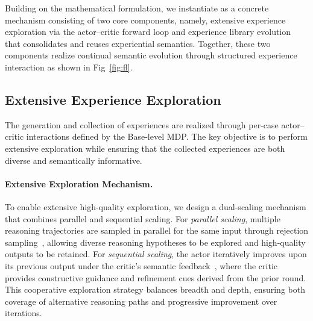 Building on the mathematical formulation, we instantiate \method{} as a concrete mechanism consisting of two core components, namely, extensive experience exploration via the actor–critic forward loop and experience library evolution that consolidates and reuses experiential semantics.
Together, these two components realize continual semantic evolution through structured experience interaction as shown in Fig~\ref{fig:fl}.

\subsection{Extensive Experience Exploration}
The generation and collection of experiences are realized through per-case actor–critic interactions defined by the Base-level MDP. The key objective is to perform extensive exploration while ensuring that the collected experiences are both diverse and semantically informative.

\paragraph{Extensive Exploration Mechanism.}
To enable extensive high-quality exploration, we design a dual-scaling mechanism that combines parallel and sequential scaling. 
For \emph{parallel scaling}, multiple reasoning trajectories are sampled in parallel for the same input through rejection sampling~\cite{fujimoto2021minimalist,dong2023raft,gulcehre2023reinforced}, allowing diverse reasoning hypotheses to be explored and high-quality outputs to be retained.
For \emph{sequential scaling}, the actor iteratively improves upon its previous output under the critic’s semantic feedback~\cite{yuksekgonul2024textgrad,shinn2023reflexion}, where the critic provides constructive guidance and refinement cues derived from the prior round.
This cooperative exploration strategy balances breadth and depth, ensuring both coverage of alternative reasoning paths and progressive improvement over iterations.

